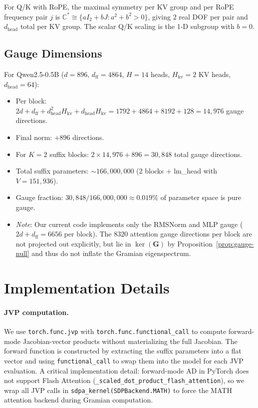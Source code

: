 \documentclass{article}
\newcommand{\bG}{\mathbf{G}}
\begin{document}
For Q/K with RoPE, the maximal symmetry per KV group and per RoPE frequency pair $j$ is $\mathbb{C}^* \cong \{aI_2 + bJ : a^2{+}b^2 > 0\}$, giving $2$ real DOF per pair and $d_\text{head}$ total per KV group.  The scalar Q/K scaling is the 1-D subgroup with $b=0$.

\subsection{Gauge Dimensions}

For Qwen2.5-0.5B ($d=896$, $d_\text{ff}=4864$, $H=14$ heads, $H_{\text{kv}}=2$ KV heads, $d_\text{head}=64$):
\begin{itemize}
    \item Per block: $2d + d_\text{ff} + d_\text{head}^2 H_{\text{kv}} + d_\text{head} H_{\text{kv}} = 1792 + 4864 + 8192 + 128 = 14{,}976$ gauge directions.
    \item Final norm: $+896$ directions.
    \item For $K=2$ suffix blocks: $2 \times 14{,}976 + 896 = 30{,}848$ total gauge directions.
    \item Total suffix parameters: $\sim 166{,}000{,}000$ (2 blocks + lm\_head with $V = 151{,}936$).
    \item Gauge fraction: $30{,}848 / 166{,}000{,}000 \approx 0.019\%$ of parameter space is pure gauge.
    \item \emph{Note}: Our current code implements only the RMSNorm and MLP gauge ($2d + d_\text{ff} = 6656$ per block).  The $8320$ attention gauge directions per block are not projected out explicitly, but lie in $\ker(\bG)$ by Proposition~\ref{prop:gauge-null} and thus do not inflate the Gramian eigenspectrum.
\end{itemize}


\section{Implementation Details}
\label{app:implementation}

\paragraph{JVP computation.}
We use \texttt{torch.func.jvp} with \texttt{torch.func.functional\_call} to compute forward-mode Jacobian-vector products without materializing the full Jacobian. The forward function is constructed by extracting the suffix parameters into a flat vector and using \texttt{functional\_call} to swap them into the model for each JVP evaluation.  A critical implementation detail: forward-mode AD in PyTorch does not support Flash Attention (\texttt{\_scaled\_dot\_product\_flash\_attention}), so we wrap all JVP calls in \texttt{sdpa\_kernel(SDPBackend.MATH)} to force the MATH attention backend during Gramian computation.
\end{document}
